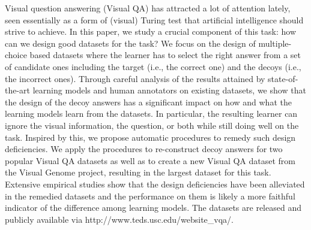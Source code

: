 Visual question answering (Visual QA) has attracted a lot of attention lately, seen essentially as a form of (visual) Turing test that artificial intelligence should strive to achieve. In this paper, we study a crucial component of this task: how can we design good datasets for the task?  We focus on the design of multiple-choice based datasets where the learner has to select the right answer from a set of candidate ones including the target (i.e., the correct one) and the decoys (i.e., the incorrect ones). Through careful analysis of the results attained by state-of-the-art learning models and human annotators on existing datasets, we show that the design of the decoy answers has a significant impact on how and what the learning models learn from the datasets. In particular, the resulting learner can ignore the visual information, the question, or both while still doing well on the task. Inspired by this, we propose automatic procedures  to remedy such design deficiencies. We apply the procedures to re-construct decoy answers for two popular Visual QA datasets as well as to create a new Visual QA dataset from the Visual Genome project, resulting in the largest dataset for this task. Extensive empirical studies show that the design deficiencies have been alleviated in the remedied datasets and the performance on them is likely a more faithful indicator of the difference among learning models. The datasets are released and publicly available via http://www.teds.usc.edu/website\_vqa/.
